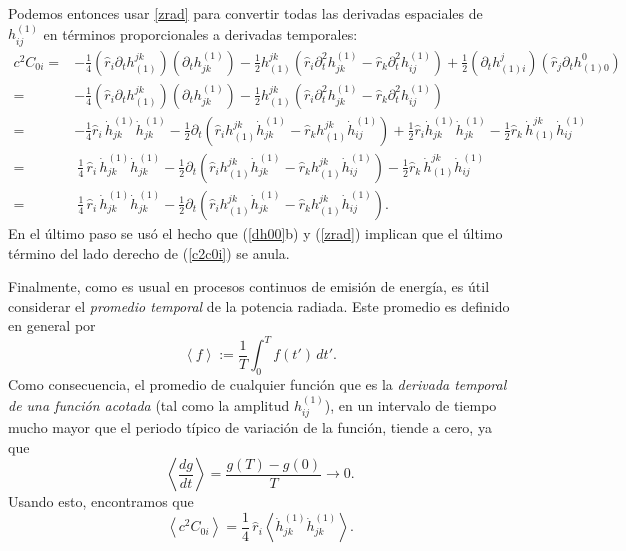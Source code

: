 Podemos entonces usar \eqref{zrad} para convertir todas las derivadas espaciales de $h^{(1)}_{ij}$ en términos proporcionales a derivadas temporales:
\begin{align}
c^2C_{0i} = & -\frac{1}{4}(\hat{r}_i\partial_t h^{jk}_{(1)})(\partial_t h_{jk}^{(1)})
-\frac{1}{2}h^{jk}_{(1)}\left(\hat{r}_i\partial^2_t h^{(1)}_{jk}-\hat{r}_k\partial^2_t
h^{(1)}_{ij}\right)
+ \frac{1}{2}(\partial_t h^j_{(1)i})(\hat{r}_j \partial_t h^0_{(1)0})\\
= & -\frac{1}{4}(\hat{r}_i\partial_t h^{jk}_{(1)})(\partial_t h_{jk}^{(1)})
-\frac{1}{2}h^{jk}_{(1)}\left(\hat{r}_i\partial^2_t h^{(1)}_{jk}-\hat{r}_k\partial^2_t
h^{(1)}_{ij}\right) \\
= & -\frac{1}{4}\hat{r}_i\,\dot{h}_{jk}^{(1)}\dot{h}_{jk}^{(1)}
-\frac{1}{2}\partial_t\left(\hat{r}_i h^{jk}_{(1)}\dot{h}^{(1)}_{jk}-\hat{r}_kh^{jk}_{(1)}\dot{h}^{(1)}_{ij}\right)
+\frac{1}{2}\hat{r}_i\dot{h}^{(1)}_{jk}\dot{h}^{(1)}_{jk}
-\frac{1}{2}\hat{r}_k\,\dot{h}^{jk}_{(1)}\dot{h}^{(1)}_{ij}\\
= &\ \frac{1}{4}\,\hat{r}_i\,\dot{h}_{jk}^{(1)}\dot{h}_{jk}^{(1)} -\frac{1}{2}\partial_t\left(\hat{r}_i h^{jk}_{(1)}\dot{h}^{(1)}_{jk}-\hat{r}_kh^{jk}_{(1)}\dot{h}^{(1)}_{ij}\right)
-\frac{1}{2}\hat{r}_k\,\dot{h}^{jk}_{(1)}\dot{h}^{(1)}_{ij} \label{c2c0i}\\
= &\ \frac{1}{4}\,\hat{r}_i\,\dot{h}_{jk}^{(1)}\dot{h}_{jk}^{(1)}
-\frac{1}{2}\partial_t\left(\hat{r}_i h^{jk}_{(1)}\dot{h}^{(1)}_{jk} -\hat{r}_kh^{jk}_{(1)}\dot{h}^{(1)}_{ij}\right).
\end{align}
En el último paso se usó el hecho que (\ref{dh00}b) y (\ref{zrad}) implican que el último término del lado derecho de (\ref{c2c0i}) se anula.

Finalmente, como es usual en procesos continuos de emisión de energía, es útil considerar el \textit{promedio temporal} de la potencia radiada. Este promedio es definido en general por
\begin{equation}
\left\langle f\right\rangle :=\frac{1}{T}\int_0^T f(t')\,dt'.
\end{equation}
Como consecuencia, el promedio de cualquier función que es la \textit{derivada temporal de una función acotada} (tal como la amplitud $h_{ij}^{(1)}$), en un intervalo de tiempo mucho mayor que el periodo típico de variación de la función, tiende a cero, ya  que
\begin{equation}
\left\langle \frac{dg}{dt}\right\rangle=\frac{g(T)-g(0)}{T}\to 0.
\end{equation}
Usando esto, encontramos que
\begin{equation}
\left\langle c^2C_{0i}\right\rangle=\frac{1}{4}\,\hat{r}_i\left\langle\dot{h}_{jk}^{(1)}\dot{h}_{jk}^{(1)}\right\rangle .
\end{equation}


